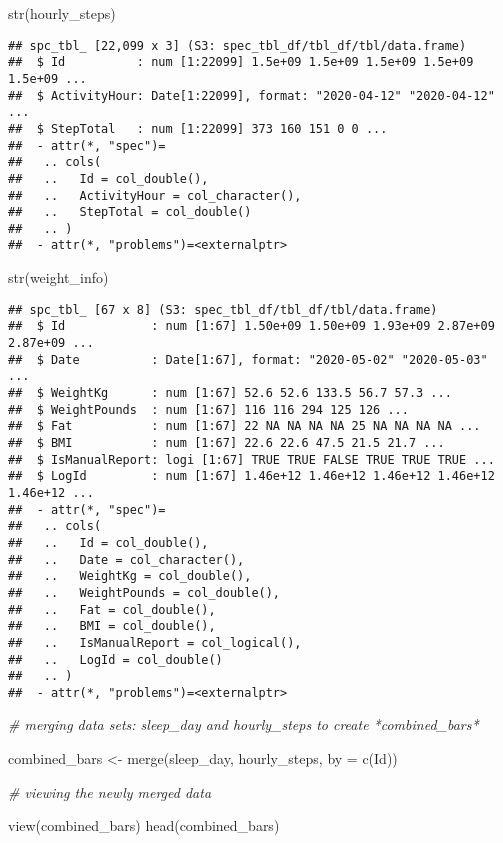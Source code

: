 \documentclass[
]{article}
\newenvironment{Shaded}{\begin{snugshade}}{\end{snugshade}}
\newcommand{\AttributeTok}[1]{\textcolor[rgb]{0.77,0.63,0.00}{#1}}
\newcommand{\CommentTok}[1]{\textcolor[rgb]{0.56,0.35,0.01}{\textit{#1}}}
\newcommand{\FunctionTok}[1]{\textcolor[rgb]{0.00,0.00,0.00}{#1}}
\newcommand{\NormalTok}[1]{#1}
\newcommand{\OtherTok}[1]{\textcolor[rgb]{0.56,0.35,0.01}{#1}}
\newcommand{\StringTok}[1]{\textcolor[rgb]{0.31,0.60,0.02}{#1}}
\begin{document}
\begin{Shaded}
\begin{Highlighting}[]
\FunctionTok{str}\NormalTok{(hourly\_steps)}
\end{Highlighting}
\end{Shaded}

\begin{verbatim}
## spc_tbl_ [22,099 x 3] (S3: spec_tbl_df/tbl_df/tbl/data.frame)
##  $ Id          : num [1:22099] 1.5e+09 1.5e+09 1.5e+09 1.5e+09 1.5e+09 ...
##  $ ActivityHour: Date[1:22099], format: "2020-04-12" "2020-04-12" ...
##  $ StepTotal   : num [1:22099] 373 160 151 0 0 ...
##  - attr(*, "spec")=
##   .. cols(
##   ..   Id = col_double(),
##   ..   ActivityHour = col_character(),
##   ..   StepTotal = col_double()
##   .. )
##  - attr(*, "problems")=<externalptr>
\end{verbatim}

\begin{Shaded}
\begin{Highlighting}[]
\FunctionTok{str}\NormalTok{(weight\_info)}
\end{Highlighting}
\end{Shaded}

\begin{verbatim}
## spc_tbl_ [67 x 8] (S3: spec_tbl_df/tbl_df/tbl/data.frame)
##  $ Id            : num [1:67] 1.50e+09 1.50e+09 1.93e+09 2.87e+09 2.87e+09 ...
##  $ Date          : Date[1:67], format: "2020-05-02" "2020-05-03" ...
##  $ WeightKg      : num [1:67] 52.6 52.6 133.5 56.7 57.3 ...
##  $ WeightPounds  : num [1:67] 116 116 294 125 126 ...
##  $ Fat           : num [1:67] 22 NA NA NA NA 25 NA NA NA NA ...
##  $ BMI           : num [1:67] 22.6 22.6 47.5 21.5 21.7 ...
##  $ IsManualReport: logi [1:67] TRUE TRUE FALSE TRUE TRUE TRUE ...
##  $ LogId         : num [1:67] 1.46e+12 1.46e+12 1.46e+12 1.46e+12 1.46e+12 ...
##  - attr(*, "spec")=
##   .. cols(
##   ..   Id = col_double(),
##   ..   Date = col_character(),
##   ..   WeightKg = col_double(),
##   ..   WeightPounds = col_double(),
##   ..   Fat = col_double(),
##   ..   BMI = col_double(),
##   ..   IsManualReport = col_logical(),
##   ..   LogId = col_double()
##   .. )
##  - attr(*, "problems")=<externalptr>
\end{verbatim}

\begin{Shaded}
\begin{Highlighting}[]
\CommentTok{\# merging data sets: sleep\_day and hourly\_steps to create *combined\_bars*}

\NormalTok{combined\_bars }\OtherTok{\textless{}{-}} \FunctionTok{merge}\NormalTok{(sleep\_day, hourly\_steps, }\AttributeTok{by =} \FunctionTok{c}\NormalTok{(}\StringTok{\textquotesingle{}Id\textquotesingle{}}\NormalTok{))}

\CommentTok{\# viewing the newly merged data }

\FunctionTok{view}\NormalTok{(combined\_bars)}
\FunctionTok{head}\NormalTok{(combined\_bars)}
\end{Highlighting}
\end{Shaded}
\end{document}
